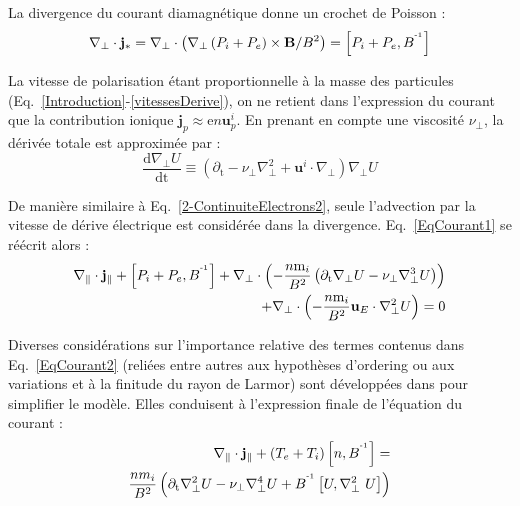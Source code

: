 La divergence du courant diamagnétique donne un crochet de Poisson :
\begin{equation}
\nabla_\perp\cdot\mathbf{j}_*=
\nabla_\perp\cdot\left(\nabla_\perp\left(
P_i+P_e\right)\times\mathbf{B}/B^2\right) = \left[P_i+P_e,B^{\operatorname{^{-1}}}\right]
\end{equation}

La vitesse de polarisation étant proportionnelle à la masse des particules
(Eq.~\ref{Introduction}-\ref{vitessesDerive}), on ne retient dans l'expression
du courant que la contribution ionique
$\mathbf{j}_p\approx\text{e}n\mathbf{u}^i_p$. En prenant en compte une viscosité
$\nu_\perp$, la dérivée totale est approximée par :
\begin{equation}
\frac{\text{d}\nabla_\perp U}{\text{dt}} \equiv 
\left(\partial_\text{t} - \nu_\perp \nabla_\perp^2 +
\mathbf{u}^i\cdot\nabla_\perp\right)\nabla_\perp U
\end{equation}

De manière similaire à Eq.~\ref{2-ContinuiteElectrons2}, seule l'advection par
la vitesse de dérive électrique est considérée dans la divergence.
Eq.~\ref{EqCourant1} se réécrit alors :
\begin{equation}\begin{split}
\label{EqCourant2}
\nabla_\parallel\cdot\mathbf{j}_\parallel + \left[P_i+P_e,B^{\operatorname{^{-1}}}\right] +
\nabla_\perp\cdot\left(-\frac{n\text{m}_i}{B^2}\left(\partial_\text{t}\nabla_\perp
U - \nu_\perp \nabla_\perp^3 U \right)\right) \\+
\nabla_\perp\cdot\left(-\frac{n\text{m}_i}{B^2}\mathbf{u}_E\cdot\nabla_\perp^2
U\right)=0
\end{split}
\end{equation}

Diverses considérations sur l'importance relative des termes contenus dans
Eq.~\ref{EqCourant2} (reliées entre autres aux hypothèses d'ordering ou aux
variations et à la finitude du rayon de Larmor) sont développées dans
\cite{Sarazin} pour simplifier le modèle. Elles conduisent à l'expression
finale de l'équation du courant :
\begin{equation}\begin{split}
\label{EqCourantFinale}
\nabla_\parallel\cdot\mathbf{j}_\parallel +
(T_e+T_i)\left[n,B^{\operatorname{^{-1}}}\right] =\\
\frac{nm_i}{B^2}\left(\partial_\text{t}\nabla_\perp^2 U - \nu_\perp
\nabla_\perp^4U+
B^{\operatorname{^{-1}}}\left[U,\nabla_\perp^2\ U\right]\right)
\end{split}
\end{equation}


